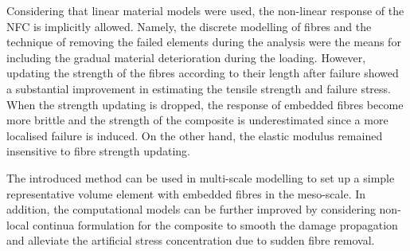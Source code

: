 	Considering that linear material models were used, the non-linear response of the NFC is implicitly allowed. Namely, the discrete modelling of fibres and the technique of removing the failed elements during the analysis were the means for including the gradual material deterioration during the loading. However, updating the strength of the fibres according to their length after failure showed a substantial improvement in estimating the tensile strength and failure stress. When the strength updating is dropped, the response of embedded fibres become more brittle and the strength of the composite is underestimated since a more localised failure is induced. On the other hand, the elastic modulus remained insensitive to fibre strength updating.
	
	The introduced method can be used in multi-scale modelling to set up a simple representative volume element with embedded fibres in the meso-scale. In addition, the computational models can be further improved by considering non-local continua formulation for the composite to smooth the damage propagation and alleviate the artificial stress concentration due to sudden fibre removal.


